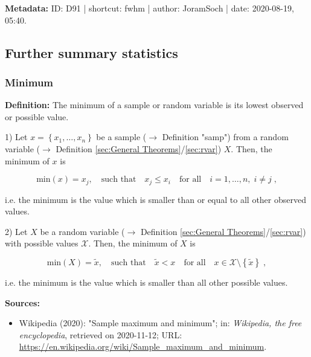\documentclass[a4paper,12pt,twoside]{book}
\begin{document}
\vspace{1em}
\textbf{Metadata:} ID: D91 | shortcut: fwhm | author: JoramSoch | date: 2020-08-19, 05:40.
\vspace{1em}



\subsection{Further summary statistics}

\subsubsection[\textit{Minimum}]{Minimum} \label{sec:min}
\setcounter{equation}{0}

\textbf{Definition:} The minimum of a sample or random variable is its lowest observed or possible value.

\vspace{1em}
1) Let $x = \left\lbrace x_1, \ldots, x_n \right\rbrace$ be a sample ($\rightarrow$ Definition "samp") from a random variable ($\rightarrow$ Definition \ref{sec:General Theorems}/\ref{sec:rvar}) $X$. Then, the minimum of $x$ is

\begin{equation} \label{eq:min-min-samp}
\mathrm{min}(x) = x_j, \quad \text{such that} \quad x_j \leq x_i \quad \text{for all} \quad i = 1, \ldots, n, \; i \neq j \; ,
\end{equation}

i.e. the minimum is the value which is smaller than or equal to all other observed values.

\vspace{1em}
2) Let $X$ be a random variable ($\rightarrow$ Definition \ref{sec:General Theorems}/\ref{sec:rvar}) with possible values $\mathcal{X}$. Then, the minimum of $X$ is

\begin{equation} \label{eq:min-min-rvar}
\mathrm{min}(X) = \tilde{x}, \quad \text{such that} \quad \tilde{x} < x \quad \text{for all} \quad x \in \mathcal{X}\setminus\left\lbrace \tilde{x} \right\rbrace \; ,
\end{equation}

i.e. the minimum is the value which is smaller than all other possible values.


\vspace{1em}
\textbf{Sources:}
\begin{itemize}
\item Wikipedia (2020): "Sample maximum and minimum"; in: \textit{Wikipedia, the free encyclopedia}, retrieved on 2020-11-12; URL: \url{https://en.wikipedia.org/wiki/Sample_maximum_and_minimum}.
\end{itemize}
\end{document}
